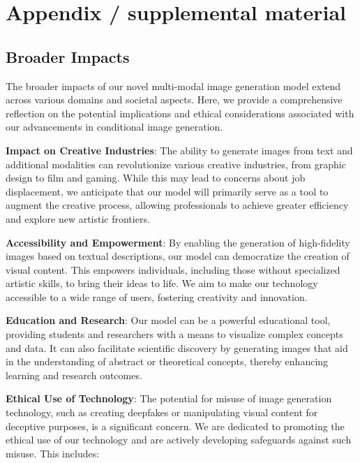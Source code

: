 \newpage
\section{Appendix / supplemental material}


\subsection{Broader Impacts}\label{sec:broader_impacts}

The broader impacts of our novel multi-modal image generation model extend across various domains and societal aspects. Here, we provide a comprehensive reflection on the potential implications and ethical considerations associated with our advancements in conditional image generation.

\textbf{Impact on Creative Industries}: The ability to generate images from text and additional modalities can revolutionize various creative industries, from graphic design to film and gaming. While this may lead to concerns about job displacement, we anticipate that our model will primarily serve as a tool to augment the creative process, allowing professionals to achieve greater efficiency and explore new artistic frontiers.

\textbf{Accessibility and Empowerment}: By enabling the generation of high-fidelity images based on textual descriptions, our model can democratize the creation of visual content. This empowers individuals, including those without specialized artistic skills, to bring their ideas to life. We aim to make our technology accessible to a wide range of users, fostering creativity and innovation.

\textbf{Education and Research}: Our model can be a powerful educational tool, providing students and researchers with a means to visualize complex concepts and data. It can also facilitate scientific discovery by generating images that aid in the understanding of abstract or theoretical concepts, thereby enhancing learning and research outcomes.

\textbf{Ethical Use of Technology}: The potential for misuse of image generation technology, such as creating deepfakes or manipulating visual content for deceptive purposes, is a significant concern. We are dedicated to promoting the ethical use of our technology and are actively developing safeguards against such misuse. This includes:


